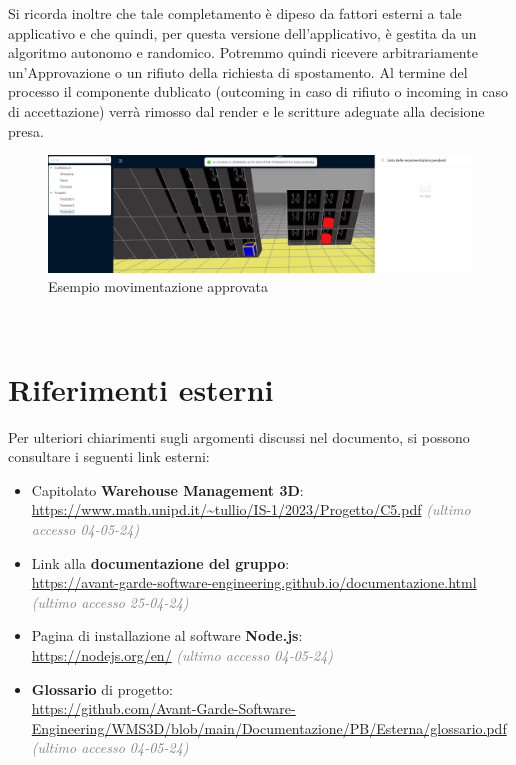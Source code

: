         Si ricorda inoltre che tale completamento è dipeso da fattori esterni a tale applicativo e che quindi, per questa versione dell'applicativo, è 
        gestita da un algoritmo autonomo e randomico.
        Potremmo quindi ricevere arbitrariamente un'Approvazione o un rifiuto della richiesta di spostamento. 
        Al termine del processo il componente dublicato (outcoming in caso di rifiuto o incoming in caso di accettazione) verrà rimosso 
        dal render e le scritture adeguate alla decisione presa.\\
        \begin{figure}[h!]
            \centering
            \includegraphics[width=1.0\textwidth]{images/ok_movimento.png}
            \caption{Esempio movimentazione approvata}
        \end{figure}\\


\newpage

\section{Riferimenti esterni}\label{sec:riferimenti_esterni}
Per ulteriori chiarimenti sugli argomenti discussi nel documento, si possono consultare i seguenti link esterni:
\begin{itemize}
    \item Capitolato \textbf{Warehouse Management 3D}:\\
    \url{https://www.math.unipd.it/~tullio/IS-1/2023/Progetto/C5.pdf} \textcolor{gray}{\textit{(ultimo accesso 04-05-24)}}
    \item Link alla \textbf{documentazione del gruppo}:\\
    \url{https://avant-garde-software-engineering.github.io/documentazione.html} \textcolor{gray}{\textit{(ultimo accesso 25-04-24)}}
    \item Pagina di installazione al software \textbf{Node.js}:\\
    \url{https://nodejs.org/en/} \textcolor{gray}{\textit{(ultimo accesso 04-05-24)}}
    \item \textbf{Glossario} di progetto: \\
    \url{https://github.com/Avant-Garde-Software-Engineering/WMS3D/blob/main/Documentazione/PB/Esterna/glossario.pdf} \textcolor{gray}{\textit{(ultimo accesso 04-05-24)}}
\end{itemize}